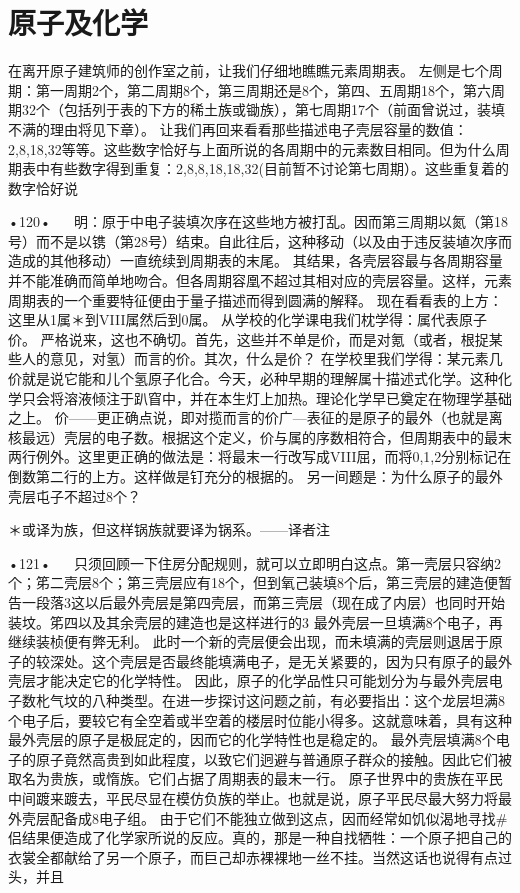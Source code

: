 \section{原子及化学}

在离开原子建筑师的创作室之前，让我们仔细地瞧瞧元素周期表。
左侧是七个周期：第一周期2个，第二周期8个，第三周期还是8个，第四、五周期18个，第六周期32个（包括列于表的下方的稀土族或锄族），第七周期17个（前面曾说过，装填不满的理由将见下章）。
让我们再回来看看那些描述电子壳层容量的数值：2,8,18,32等等。这些数字恰好与上面所说的各周期中的元素数目相同。但为什么周期表中有些数字得到重复：2,8,8,18,18,32(目前暂不讨论第七周期）。这些重复着的数字恰好说

•120•
  
明：原于中电子装填次序在这些地方被打乱。因而第三周期以氮（第18号）而不是以镌（第28号）结束。自此往后，这种移动（以及由于违反装埴次序而造成的其他移动）一直统续到周期表的末尾。
其结果，各壳层容最与各周期容量并不能准确而简单地吻合。但各周期容凰不超过其相对应的壳层容量。这样，元素周期表的一个重要特征便由于量子描述而得到圆满的解释。
现在看看表的上方：这里从1属＊到VIII属然后到0属。
从学校的化学课电我们枕学得：属代表原子价。
严格说来，这也不确切。首先，这些并不单是价，而是对氪（或者，根捉某些人的意见，对氢）而言的价。其次，什么是价？
在学校里我们学得：某元素几价就是说它能和儿个氢原子化合。今天，必种早期的理解属十描述式化学。这种化学只会将溶液倾注于趴窅中，并在本生灯上加热。理论化学早已奠定在物理学基础之上。
价——更正确点说，即对揽而言的价广—表征的是原子的最外（也就是离核最远）壳层的电子数。根据这个定义，价与属的序数相符合，但周期表中的最末两行例外。这里更正确的做法是：将最末一行改写成VIII屈，而将0,1,2分别标记在倒数第二行的上方。这样做是钉充分的根据的。
另一间题是：为什么原子的最外壳层屯子不超过8个？

＊或译为族，但这样锅族就要译为锅系。—---译者注

•121•
  
只须回顾一下住房分配规则，就可以立即明白这点。第一壳层只容纳2个；笫二壳层8个；第三壳层应有18个，但到氧己装填8个后，第三壳层的建造便暂告一段落3这以后最外壳层是第四壳层，而第三壳层（现在成了内层）也同时开始装坟。笫四以及其余壳层的建造也是这样进行的3
最外壳层一旦填满8个电子，再继续装桢便有弊无利。
此时一个新的壳层便会出现，而未填满的壳层则退居于原子的较深处。这个壳层是否最终能填满电子，是无关紧要的，因为只有原子的最外壳层才能决定它的化学特性。
因此，原子的化学品性只可能划分为与最外壳层电子数朼气坟的八种类型。在进一步探讨这问题之前，有必要指出：这个龙层坦满8个电子后，要较它有全空着或半空着的楼层时位能小得多。这就意味着，具有这种最外壳层的原子是极屁定的，因而它的化学特性也是稳定的。
最外壳层填满8个电子的原子竟然高贵到如此程度，以致它们迥避与普通原子群众的接触。因此它们被取名为贵族，或惰族。它们占据了周期表的最末一行。
原子世界中的贵族在平民中间踱来踱去，平民尽显在模仿负族的举止。也就是说，原子平民尽最大努力将最外壳层配备成8电子组。
由于它们不能独立做到这点，因而经常如饥似渴地寻找#侣结果便造成了化学家所说的反应。真的，那是一种自找牺牲：一个原子把自己的衣裳全都献给了另一个原子，而巨己却赤裸裸地一丝不挂。当然这话也说得有点过头，并且

